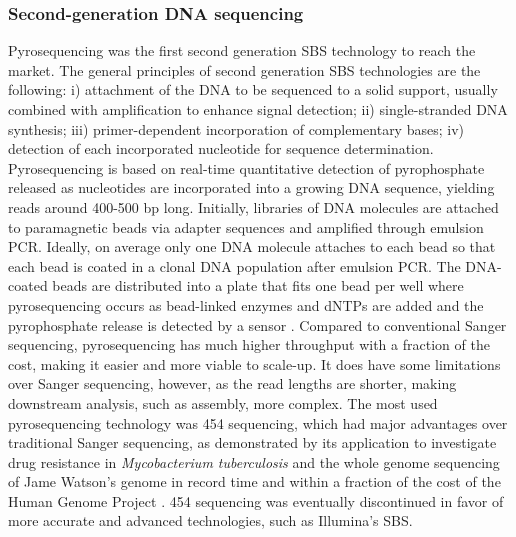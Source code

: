 \subsubsection{Second-generation DNA sequencing}

Pyrosequencing \cite{nyren_solid_1993, ronaghi_real-time_1996, margulies_genome_2005} was the first second generation \ac{SBS} technology to reach the market. The general principles of second generation \ac{SBS} technologies are the following: i) attachment of the \ac{DNA} to be sequenced to a solid support, usually combined with amplification to enhance signal detection; ii) single-stranded \ac{DNA} synthesis; iii) primer-dependent incorporation of complementary bases; iv) detection of each incorporated nucleotide for sequence determination. Pyrosequencing is based on real-time quantitative detection of pyrophosphate released as nucleotides are incorporated into a growing \ac{DNA} sequence, yielding reads around 400-500 \ac{bp} long. Initially, libraries of \ac{DNA} molecules are attached to paramagnetic beads via adapter sequences and amplified through emulsion \ac{PCR}. Ideally, on average only one \ac{DNA} molecule attaches to each bead so that each bead is coated in a clonal \ac{DNA} population after emulsion \ac{PCR}. The \ac{DNA}-coated beads are distributed into a plate that fits one bead per well where pyrosequencing occurs as bead-linked enzymes and dNTPs are added and the pyrophosphate release is detected by a sensor \cite{heather_sequence_2016, nyren_history_2015, ronaghi_sequencing_1998, nyren_enzymatic_1987}. Compared to conventional Sanger sequencing, pyrosequencing has much higher throughput with a fraction of the cost, making it easier and more viable to scale-up. It does have some limitations over Sanger sequencing, however, as the read lengths are shorter, making downstream analysis, such as assembly, more complex. The most used pyrosequencing technology was 454 sequencing, which had major advantages over traditional Sanger sequencing, as demonstrated by its application to investigate drug resistance in \textit{Mycobacterium tuberculosis} \cite{andries_diarylquinoline_2005} and the whole genome sequencing of Jame Watson’s genome in record time and within a fraction of the cost of the Human Genome Project \cite{rothberg_development_2008, wheeler_complete_2008}. 454 sequencing was eventually discontinued in favor of more accurate and advanced technologies, such as Illumina’s \ac{SBS}.
